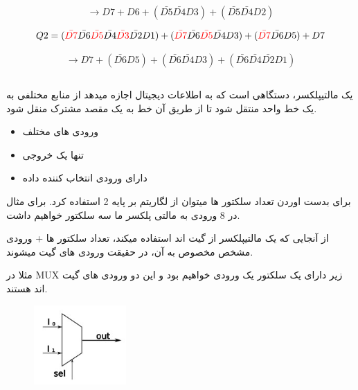 \documentclass[20pt, a4paper]{article}
\begin{document}
\begin{equation}
	\rightarrow D7+D6+(\bar{D5}\bar{D4}D3)+(\bar{D5}\bar{D4}D2)
\end{equation}

\begin{equation}
	Q2 = (\textcolor{red}{\bar{D7}}\bar{D6}\textcolor{red}{\bar{D5}}\bar{D4}\textcolor{red}{\bar{D3}}\bar{D2}D1) +
	(\textcolor{red}{\bar{D7}}\bar{D6}\textcolor{red}{\bar{D5}}\bar{D4}D3)+
	(\textcolor{red}{\bar{D7}}\bar{D6}D5)+
	D7
\end{equation}

\begin{equation}
	\rightarrow D7 + (\bar{D6}D5)+ (\bar{D6}\bar{D4}D3)+(\bar{D6}\bar{D4}\bar{D2}D1)
\end{equation}

\subsection{}
یک مالتیپلکسر، دستگاهی است که به اطلاعات دیجیتال 
اجازه میدهد از منابع مختلفی به یک خط واحد منتقل شود تا از طریق آن خط
به یک مقصد مشترک منقل شود.

\begin{itemize}
	\item ورودی های مختلف
	\item تنها یک خروجی
	\item دارای ورودی انتخاب کننده داده
\end{itemize}

برای بدست اوردن تعداد سلکتور ها میتوان از لگاریتم بر پایه 2 استفاده کرد.
برای مثال در 8 ورودی به مالتی پلکسر ما سه سلکتور خواهیم داشت.

از آنجایی که یک مالتیپلکسر از گیت اند استفاده میکند، 
تعداد سلکتور ها + ورودی مشخص مخصوص به آن، در حقیقت ورودی های گیت میشوند.

مثلا در MUX 
زیر دارای یک سلکتور یک ورودی خواهیم بود و این دو ورودی های گیت اند هستند.

\begin{figure}[htbp]\centering
	\centerline{\includegraphics[width=100pt]{img/lastest/mux2to1.jpg}}
\end{figure}
\end{document}
